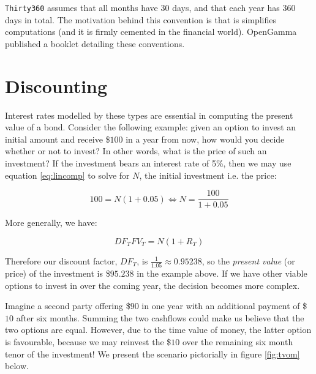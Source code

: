 \texttt{Thirty360} assumes that all months have 30 days, and that each year has
360 days in total. The motivation behind this convention is that is simplifies
computations (and it is firmly cemented in the financial world).
OpenGamma\cite{marketconvs} published a booklet detailing these conventions.

\section{Discounting}\label{sec:discounting}

Interest rates modelled by these types are essential in computing the present
value of a bond. Consider the following example: given an option to invest an
initial amount and receive \$$100$ in a year from now, how would you decide 
whether or not to invest? In other words, what is the price of such an 
investment? If the investment bears an interest rate of 5\%, then we may use
equation \ref{eq:lincomp} to solve for $N$, the initial investment i.e. the price:

\begin{equation}
100 = N (1 + 0.05) \Leftrightarrow N = \frac{100}{1+0.05}
\end{equation}

More generally, we have:

\begin{equation}
DF_T FV_T= N (1 + R_T)
\end{equation}

Therefore our discount factor, $DF_T$, is $\frac{1}{1.05} \approx 0.95238$,
so the \emph{present value} (or price) of the investment is \$$95.238$
in the example above. If we have other viable options to invest in over the coming
year, the decision becomes more complex.

Imagine a second party offering \$$90$ in one year with an additional payment of
\$$10$ after six months. Summing the two cashflows could make us believe that the
two options are equal. However, due to the time value of money, the latter option
is favourable, because we may reinvest the \$$10$ over the remaining six
month tenor of the investment! We present the scenario pictorially in figure
\ref{fig:tvom} below.


